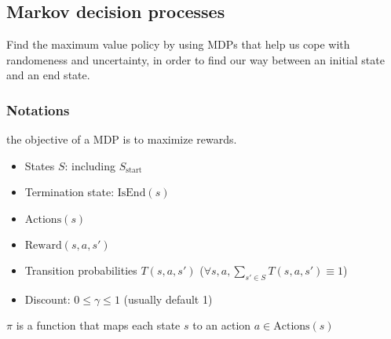 \subsection{Markov decision processes}

Find the maximum value policy by using MDPs that help us cope with randomeness
and uncertainty, in order to find our way between an initial state and an end
state.

\subsubsection{Notations}

 the objective of a MDP is to maximize rewards.\begin{itemize}
    \item States $S$: including $S_\text{start}$
    \item Termination state: $\text{IsEnd}(s)$
    \item $\text{Actions}(s)$
    \item $\text{Reward}(s,a,s')$
    \item Transition probabilities $T(s,a,s')$ ($\forall s,a, \sum_{s'\in S} T(s,a,s') \equiv 1$)
    \item Discount: $0 \le \gamma \le 1$ (usually default 1)
\end{itemize}

 $\pi$ is a function that maps each state $s$ to an action $a \in
\text{Actions}(s)$